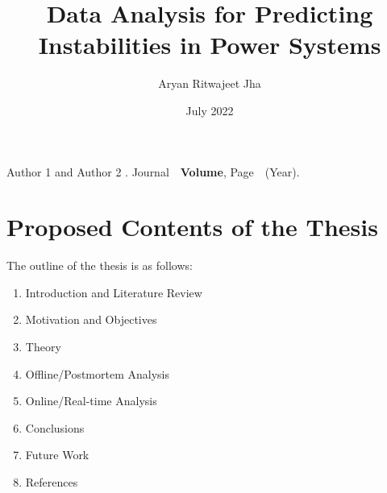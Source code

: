 \documentclass[MS,synopsis]{iitddiss}
\title{Data Analysis for Predicting Instabilities in Power Systems}
\author{Aryan Ritwajeet Jha}
\date{July 2022}
\begin{document}
\maketitle

\setcounter{page}{0}

\newpage



















\begin{singlespace}
\begin{thebibliography}{10}

Author 1 and Author 2
.
\newblock Journal\ \ {\bf Volume}, Page\ \ (Year).
\end{thebibliography}

\end{singlespace}

\section{Proposed Contents of the Thesis}
The outline of the thesis is as follows:
\begin{enumerate}
\item Introduction and Literature Review
\item Motivation and Objectives
\item Theory
\item Offline/Postmortem Analysis
\item Online/Real-time Analysis
\item Conclusions
\item Future Work
\item References
\end{enumerate}
\end{document}
